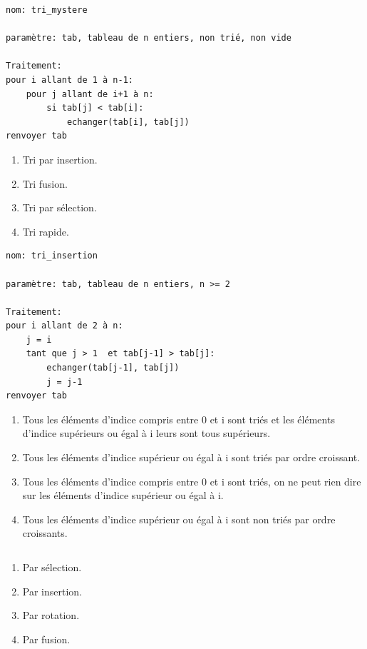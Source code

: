 \begin{lstlisting}
nom: tri_mystere

paramètre: tab, tableau de n entiers, non trié, non vide

Traitement:
pour i allant de 1 à n-1:
    pour j allant de i+1 à n:
        si tab[j] < tab[i]:
            echanger(tab[i], tab[j])
renvoyer tab
\end{lstlisting}
\begin{enumerate}
\item Tri par insertion. 
\item Tri fusion.
\item Tri par sélection. %
\item Tri rapide.
\end{enumerate}

\begin{lstlisting}
nom: tri_insertion

paramètre: tab, tableau de n entiers, n >= 2

Traitement:
pour i allant de 2 à n:
    j = i
    tant que j > 1  et tab[j-1] > tab[j]:
        echanger(tab[j-1], tab[j])
        j = j-1
renvoyer tab
\end{lstlisting}
\begin{enumerate}
\item Tous les éléments d'indice compris entre 0 et i sont triés et les éléments d'indice supérieurs ou égal à i leurs sont tous supérieurs.
\item Tous les éléments d'indice supérieur ou égal à i sont triés par ordre croissant.
\item Tous les éléments d'indice compris entre 0 et i sont triés, on ne peut rien dire sur les éléments d'indice supérieur ou égal à i. %
\item Tous les éléments d'indice supérieur ou égal à i sont non triés par ordre croissants.
\end{enumerate}

\begin{lstlisting}
\end{lstlisting}
\begin{enumerate}
\item Par sélection.
\item Par insertion.
\item Par rotation. %
\item Par fusion.
\end{enumerate}

